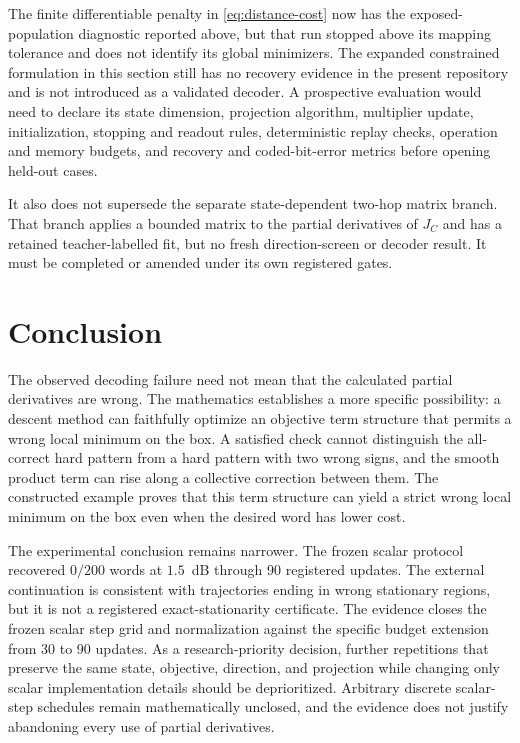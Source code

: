 \documentclass[11pt]{article}
\theoremstyle{remark}
\begin{document}
The finite differentiable penalty in \cref{eq:distance-cost} now has the
exposed-population diagnostic reported above, but that run stopped above its
mapping tolerance and does not identify its global minimizers.  The expanded
constrained formulation in this section still has no recovery evidence in the
present repository and is not introduced as a validated decoder.  A
prospective evaluation would need to declare its state dimension, projection
algorithm, multiplier update, initialization, stopping and readout rules,
deterministic replay checks, operation and memory budgets, and recovery and
coded-bit-error metrics before opening held-out cases.

It also does not supersede the separate state-dependent two-hop matrix branch.
That branch applies a bounded matrix to the partial derivatives of $J_C$ and
has a retained teacher-labelled fit, but no fresh direction-screen or decoder
result.  It must be completed or amended under its own registered gates.

\section{Conclusion}

The observed decoding failure need not mean that the calculated partial
derivatives are wrong.  The mathematics establishes a more specific
possibility: a descent method can faithfully optimize an objective term
structure that permits a wrong local minimum on the box.  A satisfied check
cannot distinguish the
all-correct hard pattern from a hard pattern with two wrong signs, and the smooth product term can
rise along a collective correction between them.  The constructed example
proves that this term structure can yield a strict wrong local minimum on the
box even when the desired word has lower cost.

The experimental conclusion remains narrower.  The frozen scalar protocol
recovered $0/200$ words at $1.5$~dB through 90 registered updates.  The
external continuation is consistent with trajectories ending in wrong
stationary regions, but it is not a registered exact-stationarity certificate.
The evidence closes the frozen scalar step grid and normalization against the
specific budget extension from 30 to 90 updates.  As a research-priority
decision, further repetitions that preserve the same state, objective,
direction, and projection while changing only scalar implementation details
should be deprioritized.  Arbitrary discrete scalar-step schedules remain
mathematically unclosed, and the evidence does not justify abandoning every
use of partial derivatives.
\end{document}
